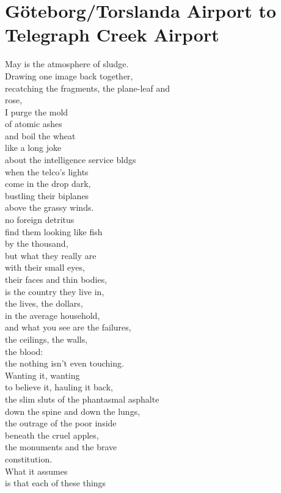 \documentclass[smalldemyvopaper,11pt,twoside,onecolumn,openright,extrafontsizes]{memoir}
\newlength\drop
\begin{document}
\chapter{Göteborg/Torslanda Airport to Telegraph Creek Airport}
May is the atmosphere of sludge.
\\Drawing one image back together,
\\recatching the fragments, the plane-leaf and
\\rose,
\\I purge the mold
\\of atomic ashes
\\and boil the wheat
\\like a long joke
\\about the intelligence service bldgs
\\when the telco's lights
\\come in the drop dark,
\\bustling their biplanes
\\above the grassy winds.
\\no foreign detritus
\\find them looking like fish
\\by the thousand,
\\but what they really are
\\with their small eyes,
\\their faces and thin bodies,
\\is the country they live in,
\\the lives, the dollars,
\\in the average household,
\\and what you see are the failures,
\\the ceilings, the walls,
\\the blood:
\\the nothing isn't even touching.
\\Wanting it, wanting
\\to believe it, hauling it back,
\\the slim sluts of the phantasmal asphalte
\\down the spine and down the lungs,
\\the outrage of the poor inside
\\beneath the cruel apples,
\\the monuments and the brave
\\constitution.
\\What it assumes
\\is that each of these things
\end{document}
